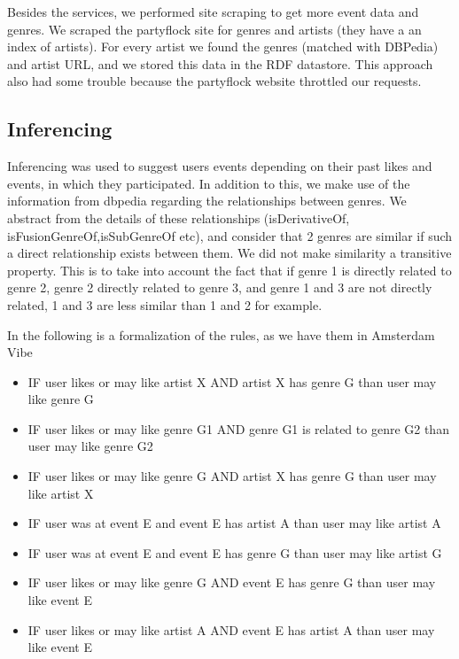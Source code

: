 \documentclass[12pt, a4paper, lithuanian]{article}
\begin{document}
Besides the services, we performed site scraping to get more event data and genres. We scraped the partyflock site for genres and artists (they have a an index of artists). For every artist we found the genres (matched with DBPedia) and artist URL, and we stored this data in the RDF datastore. This approach also had some trouble because the partyflock website throttled our requests.

\subsection{Inferencing}

Inferencing was used to suggest users events depending on their past likes and events, in which they participated. In addition to this, we make use of the information from dbpedia regarding the relationships between genres. We abstract from the details of these relationships (isDerivativeOf, isFusionGenreOf,isSubGenreOf etc), and consider that 2 genres are similar if such a direct relationship exists between them. We did not make similarity a transitive property. This is to take into account the fact that if genre 1 is directly related to genre 2, genre 2 directly related to genre 3, and genre 1 and 3 are not directly related, 1 and 3 are less similar than 1 and 2 for example. 

In the following is a formalization of the rules, as we have them in Amsterdam Vibe

\begin{itemize}
  
    \item IF user likes or may like artist X AND artist X has genre G than user may like genre G

    \item IF user likes or may like genre G1 AND genre G1 is related to genre G2 than user may like genre G2

    \item IF user likes or may like genre G AND artist X has genre G than user may like artist X

    \item IF user was at event E and event E has artist A than user may like artist A
 
    \item IF user was at event E and event E has genre G than user may like artist G

    \item IF user likes or may like genre G AND event E has genre G than user may like event E

    \item IF user likes or may like artist A AND event E has artist A than user may like event E


\end{itemize}
\end{document}
